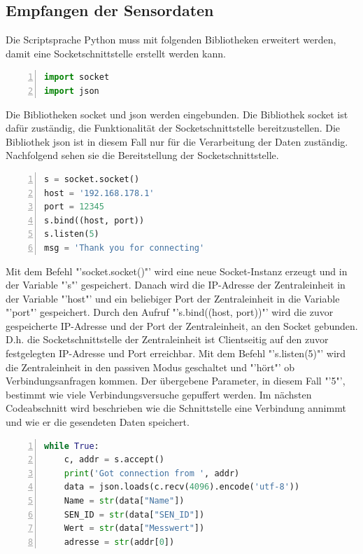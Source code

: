 \subsection{Empfangen der Sensordaten}
Die Scriptsprache Python muss mit folgenden Bibliotheken erweitert werden, damit eine Socketschnittstelle erstellt werden kann.
\begin{lstlisting}[caption=Einbinden der Bibliotheken für die Schnittstelle,frame=single,numbers=left,language=Python]
import socket
import json
\end{lstlisting}
Die Bibliotheken socket und json werden eingebunden. Die Bibliothek socket ist dafür zuständig, die Funktionalität der Socketschnittstelle bereitzustellen. Die Bibliothek json ist in diesem Fall nur für die Verarbeitung der Daten zuständig.\hfill
\noindent Nachfolgend sehen sie die Bereitstellung der Socketschnittstelle.
\begin{lstlisting}[caption=Bereitstellen der Socketschnittstelle,frame=single,numbers=left,language=Python]
s = socket.socket()
host = '192.168.178.1'
port = 12345
s.bind((host, port))
s.listen(5)
msg = 'Thank you for connecting'
\end{lstlisting}
Mit dem Befehl "'socket.socket()"' wird eine neue Socket-Instanz erzeugt und in der Variable "'s"' gespeichert. Danach wird die IP-Adresse der Zentraleinheit in der Variable "'host"' und ein beliebiger Port der Zentraleinheit in die Variable "'port"' gespeichert. Durch den Aufruf "'s.bind((host, port))"' wird die zuvor gespeicherte IP-Adresse und der Port der Zentraleinheit, an den Socket gebunden. D.h. die Socketschnittstelle der Zentraleinheit ist Clientseitig auf den zuvor festgelegten IP-Adresse und Port erreichbar. Mit dem Befehl "'s.listen(5)"' wird die Zentraleinheit in den passiven Modus geschaltet und "'hört"' ob Verbindungsanfragen kommen. Der übergebene Parameter, in diesem Fall "'5"', bestimmt wie viele Verbindungsversuche gepuffert werden.
\noindent Im nächsten Codeabschnitt wird beschrieben wie die Schnittstelle eine Verbindung annimmt und wie er die gesendeten Daten speichert.
\begin{lstlisting}[caption=Speichern der Daten,frame=single,numbers=left,language=Python]
while True:
	c, addr = s.accept()
	print('Got connection from ', addr)
	data = json.loads(c.recv(4096).encode('utf-8'))
	Name = str(data["Name"])
	SEN_ID = str(data["SEN_ID"])
	Wert = str(data["Messwert"])
	adresse = str(addr[0])
\end{lstlisting}\label{Daten}
